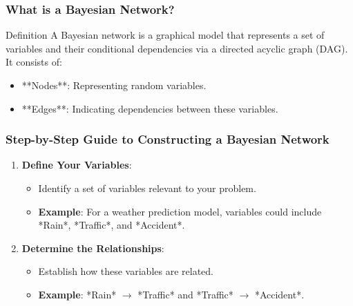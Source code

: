 \documentclass[aspectratio=169]{beamer}
\begin{document}
\begin{frame}[fragile]
    \frametitle{What is a Bayesian Network?}
    \begin{block}{Definition}
        A Bayesian network is a graphical model that represents a set of variables and their conditional dependencies via a directed acyclic graph (DAG). It consists of:
    \end{block}
    \begin{itemize}
        \item **Nodes**: Representing random variables.
        \item **Edges**: Indicating dependencies between these variables.
    \end{itemize}
\end{frame}

\begin{frame}[fragile]
    \frametitle{Step-by-Step Guide to Constructing a Bayesian Network}
    \begin{enumerate}
        \item \textbf{Define Your Variables}:
            \begin{itemize}
                \item Identify a set of variables relevant to your problem.
                \item \textbf{Example}: For a weather prediction model, variables could include *Rain*, *Traffic*, and *Accident*.
            \end{itemize}
        
        \item \textbf{Determine the Relationships}:
            \begin{itemize}
                \item Establish how these variables are related.
                \item \textbf{Example}: *Rain* $\rightarrow$ *Traffic* and *Traffic* $\rightarrow$ *Accident*.
            \end{itemize}
    \end{enumerate}
\end{frame}
\end{document}
